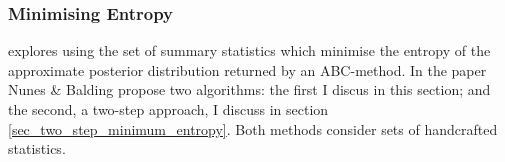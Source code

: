 \documentclass[11pt,a4paper]{article}
\theoremstyle{break}
\begin{document}


\subsubsection{Minimising Entropy}\label{sec_minimsing_entropy}


  \par \cite[]{on_optimal_selection_of_summary_stats_for_ABC} explores using the set of summary statistics which minimise the entropy of the approximate posterior distribution returned by an ABC-method. In the paper Nunes \& Balding propose two algorithms: the first I discus in this section; and the second, a two-step approach, I discuss in section \ref{sec_two_step_minimum_entropy}. Both methods consider sets of handcrafted statistics.
\end{document}
